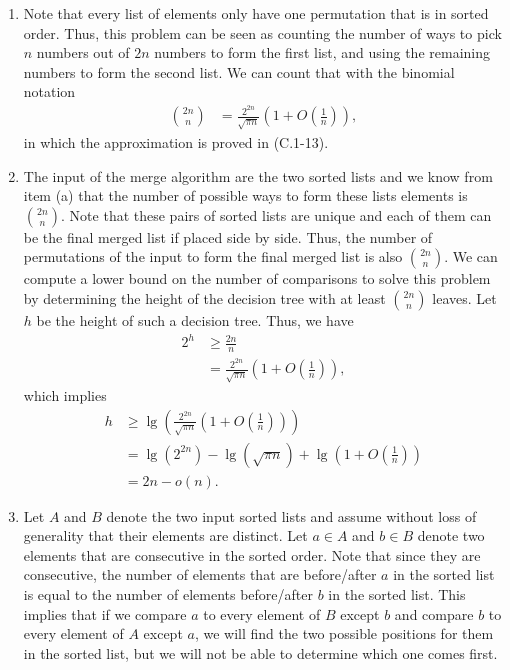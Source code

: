 \documentclass{report}
\makeatletter
\renewenvironment{framed}{%
 \def\FrameCommand##1{\hskip\@totalleftmargin
 \fboxsep=\FrameSep\fbox{##1}}%
 \MakeFramed {\advance\hsize-\width
   \@totalleftmargin\z@ \linewidth\hsize
   \@setminipage}}%
 {\par\unskip\endMakeFramed}
\makeatother
\begin{document}
\begin{enumerate}
\begin{framed}
\begin{enumerate}
\item Note that every list of elements only have one permutation that is in
sorted order. Thus, this problem can be seen as counting the number of ways to
pick $n$ numbers out of $2n$ numbers to form the first list, and using the
remaining numbers to form the second list. We can count that with the binomial
notation
\begin{equation*}
\begin{aligned}
  \binom{2n}{n} &= \frac{2^{2n}}{\sqrt{\pi n}} \left( 1 + O\left(\frac{1}{n}\right) \right),
\end{aligned}
\end{equation*}
in which the approximation is proved in (C.1-13).
\item The input of the merge algorithm are the two sorted lists and we know from
item (a) that the number of possible ways to form these lists elements is
$\binom{2n}{n}$. Note that these pairs of sorted lists are unique and each of
them can be the final merged list if placed side by side. Thus, the number of
permutations of the input to form the final merged list is also $\binom{2n}{n}$.
We can compute a lower bound on the number of comparisons to solve this problem
by determining the height of the decision tree with at least $\binom{2n}{n}$
leaves. Let $h$ be the height of such a decision tree. Thus, we have
\begin{equation*}
\begin{aligned}
  2^h &\ge \frac{2n}{n}\\
      &=   \frac{2^{2n}}{\sqrt{\pi n}} \left( 1 + O\left(\frac{1}{n}\right) \right),
\end{aligned}
\end{equation*}
which implies
\begin{equation*}
\begin{aligned}
  h &\ge \lg \left( \frac{2^{2n}}{\sqrt{\pi n}} \left(1 + O\left( \frac{1}{n} \right) \right) \right)\\
    &=   \lg (2^{2n}) - \lg(\sqrt{\pi n}) + \lg\left(1 + O\left( \frac{1}{n} \right)\right)\\
    &=   2n - o(n).
\end{aligned}
\end{equation*}

\item Let $A$ and $B$ denote the two input sorted lists and assume without loss
of generality that their elements are distinct. Let $a \in A$ and $b \in B$
denote two elements that are consecutive in the sorted order. Note that since
they are consecutive, the number of elements that are before/after $a$ in the
sorted list is equal to the number of elements before/after $b$ in the sorted
list. This implies that if we compare $a$ to every element of $B$ except $b$ and
compare $b$ to every element of $A$ except $a$, we will find the two possible
positions for them in the sorted list, but we will not be able to determine
which one comes first.


\end{enumerate}
\end{framed}
\end{enumerate}
\end{document}
